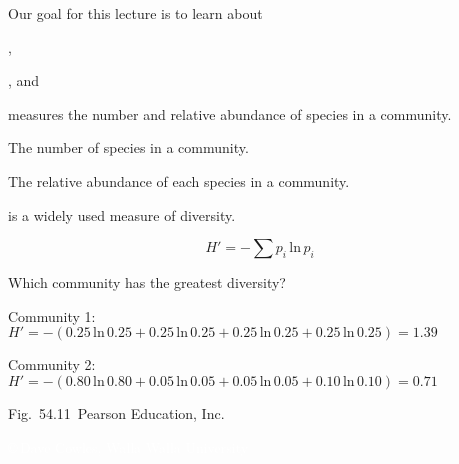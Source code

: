 \documentclass[t]{beamer}
\begin{document}

\begin{frame}{Our goal for this lecture is to learn about}

	\hangpara {},
	
	\hangpara {}, and
	
	\hangpara {}
	
\end{frame}
%
\begin{frame}{ measures the number and relative abundance of species in a community.}

	\hangpara {} The number of species in a community.
	
	\hangpara {} The relative abundance of each species in a community.
	
	\hangpara {} is a widely used measure of diversity.
	
	\[H' = -\sum p_i\,\mathrm{ln}\,p_i\]
	
\end{frame}
{
\begin{frame}[t]{Which community has the greatest diversity?}

	\pause

	\vspace*{10\baselineskip}
	
	Community 1: \\$H\prime = -(0.25\,\mathrm{ln}\,0.25 + 0.25\,\mathrm{ln}\,0.25 +0.25\,\mathrm{ln}\,0.25 +0.25\,\mathrm{ln}\,0.25) = 1.39$

	\vspace*{\baselineskip}
	
	Community 2: \\$H\prime = -(0.80\,\mathrm{ln}\,0.80 + 0.05\,\mathrm{ln}\,0.05 +0.05\,\mathrm{ln}\,0.05 +0.10\,\mathrm{ln}\,0.10) = 0.71$
	
	\vfilll

	\hfill \tiny Fig.~54.11~Pearson Education, Inc.

\end{frame}
}
%
{
\begin{frame}[b]

\hfill \tiny \textcolor{white}{\copyright\,Dave Cowles, Walla Walla University}
\end{frame}
}
\end{document}
